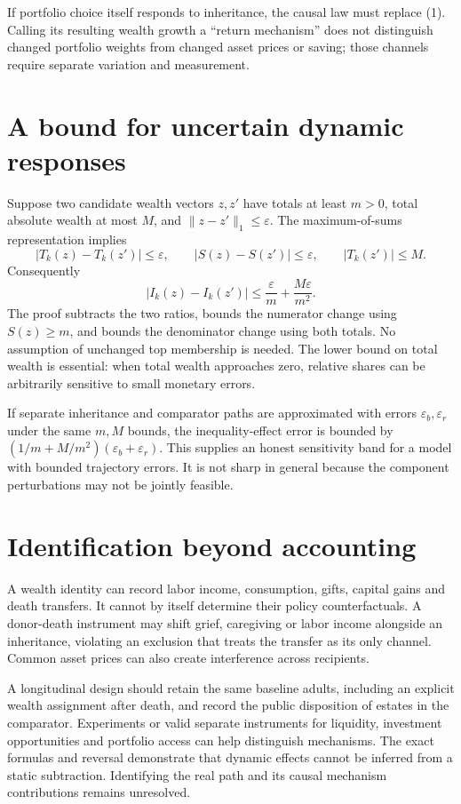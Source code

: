 \documentclass[11pt]{article}
\begin{document}
If portfolio choice itself responds to inheritance, the causal law must replace (1). Calling its resulting wealth growth a ``return mechanism'' does not distinguish changed portfolio weights from changed asset prices or saving; those channels require separate variation and measurement.

\section*{A bound for uncertain dynamic responses}
Suppose two candidate wealth vectors $z,z'$ have totals at least $m>0$, total absolute wealth at most $M$, and $\|z-z'\|_1\leq\varepsilon$. The maximum-of-sums representation implies
\[
 |T_k(z)-T_k(z')|\leq\varepsilon,\qquad
 |S(z)-S(z')|\leq\varepsilon,\qquad |T_k(z')|\leq M.
\]
Consequently
\[
 |I_k(z)-I_k(z')|
 \leq\frac{\varepsilon}{m}+\frac{M\varepsilon}{m^2}. \tag{3}
\]
The proof subtracts the two ratios, bounds the numerator change using $S(z)\geq m$, and bounds the denominator change using both totals. No assumption of unchanged top membership is needed. The lower bound on total wealth is essential: when total wealth approaches zero, relative shares can be arbitrarily sensitive to small monetary errors.

If separate inheritance and comparator paths are approximated with errors $\varepsilon_b,\varepsilon_r$ under the same $m,M$ bounds, the inequality-effect error is bounded by $(1/m+M/m^2)(\varepsilon_b+\varepsilon_r)$. This supplies an honest sensitivity band for a model with bounded trajectory errors. It is not sharp in general because the component perturbations may not be jointly feasible.

\section*{Identification beyond accounting}
A wealth identity can record labor income, consumption, gifts, capital gains and death transfers. It cannot by itself determine their policy counterfactuals. A donor-death instrument may shift grief, caregiving or labor income alongside an inheritance, violating an exclusion that treats the transfer as its only channel. Common asset prices can also create interference across recipients.

A longitudinal design should retain the same baseline adults, including an explicit wealth assignment after death, and record the public disposition of estates in the comparator. Experiments or valid separate instruments for liquidity, investment opportunities and portfolio access can help distinguish mechanisms. The exact formulas and reversal demonstrate that dynamic effects cannot be inferred from a static subtraction. Identifying the real path and its causal mechanism contributions remains unresolved.
\end{document}
